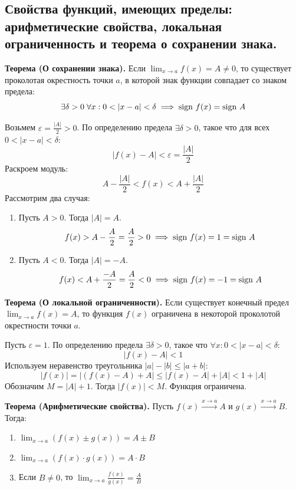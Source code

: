 \subsection{Свойства функций, имеющих пределы: арифметические свойства, локальная ограниченность и теорема о сохранении знака.}

\textbf{Теорема (О сохранении знака).} 
Если $\lim_{x\to a} f(x) = A \neq 0$, то существует проколотая окрестность точки $a$, в которой знак функции совпадает со знаком предела:
\[ \exists \delta > 0\; \forall x: 0 < |x - a| < \delta \implies \text{sign\ } f(x) = \text{sign\ } A \]

\begin{tcolorbox}[title=Доказательство]
	Возьмем $\varepsilon = \frac{|A|}{2} > 0$.
	По определению предела $\exists \delta > 0$, такое что для всех $0 < |x - a| < \delta$:
	\[ |f(x) - A| < \varepsilon = \frac{|A|}{2} \]
	Раскроем модуль:
	\[ A - \frac{|A|}{2} < f(x) < A + \frac{|A|}{2} \]
	Рассмотрим два случая:
	\begin{enumerate}
		\item Пусть $A > 0$. Тогда $|A| = A$.
		\[ f(x) > A - \frac{A}{2} = \frac{A}{2} > 0 \implies \text{sign\ } f(x) = 1 = \text{sign\ } A \]
		\item Пусть $A < 0$. Тогда $|A| = -A$.
		\[ f(x) < A + \frac{-A}{2} = \frac{A}{2} < 0 \implies \text{sign\ } f(x) = -1 = \text{sign\ } A \]
	\end{enumerate}
\end{tcolorbox}

\textbf{Теорема (О локальной ограниченности).}
Если существует конечный предел $\lim_{x \to a} f(x) = A$, то функция $f(x)$ ограничена в некоторой проколотой окрестности точки $a$.

\begin{tcolorbox}[title=Доказательство]
	Пусть $\varepsilon = 1$.
	По определению предела $\exists \delta > 0$, такое что $\forall x: 0 < |x - a| < \delta$:
	\[ |f(x) - A| < 1 \]
	Используем неравенство треугольника $|a| - |b| \le |a+b|$:
	\[ |f(x)| = |(f(x) - A) + A| \leq |f(x) - A| + |A| < 1 + |A| \]
	Обозначим $M = |A| + 1$. Тогда $|f(x)| < M$.
	Функция ограничена.
\end{tcolorbox}

\textbf{Теорема (Арифметические свойства).}
Пусть $f(x) \xrightarrow{x\to a} A$ и $g(x) \xrightarrow{x\to a} B$. Тогда:
\begin{enumerate}
	\item $\lim_{x\to a} (f(x) \pm g(x)) = A \pm B$
	\item $\lim_{x\to a} (f(x) \cdot g(x)) = A \cdot B$
	\item Если $B \neq 0$, то $\lim_{x\to a} \frac{f(x)}{g(x)} = \frac{A}{B}$
\end{enumerate}

